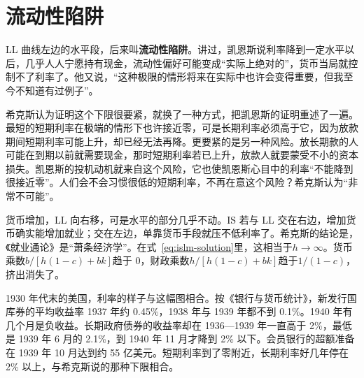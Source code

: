 \section{流动性陷阱}\label{sec:islm-trap}

LL 曲线左边的水平段，后来叫\textbf{流动性陷阱}。讲过，凯恩斯说利率降到一定水平以后，几乎人人宁愿持有现金，流动性偏好可能变成“实际上绝对的”，货币当局就控制不了利率了\cite{keynes1936}。他又说，“这种极限的情形将来在实际中也许会变得重要，但我至今不知道有过例子”\cite{keynes1936}。

希克斯认为证明这个下限很要紧，就换了一种方式，把凯恩斯的证明重述了一遍\cite{hicks1937}。最短的短期利率在极端的情形下也许接近零，可是长期利率必须高于它，因为放款期间短期利率可能上升，却已经无法再降\cite{hicks1937}。更要紧的是另一种风险。放长期款的人可能在到期以前就需要现金，那时短期利率若已上升，放款人就要蒙受不小的资本损失\cite{hicks1937}。凯恩斯的投机动机就来自这个风险，它也使凯恩斯心目中的利率“不能降到很接近零”\cite{hicks1937}。人们会不会习惯很低的短期利率，不再在意这个风险？希克斯认为“非常不可能”\cite{hicks1937}。

货币增加，LL 向右移，可是水平的部分几乎不动\cite{hicks1937}。IS 若与 LL 交在右边，增加货币确实能增加就业；交在左边，单靠货币手段就压不低利率了\cite{hicks1937}。希克斯的结论是，《就业通论》是“萧条经济学”\cite{hicks1937}。在式~\eqref{eq:islm-solution}里，这相当于$h\to\infty$。货币乘数$b/[h(1-c)+bk]$趋于 0，财政乘数$h/[h(1-c)+bk]$趋于$1/(1-c)$，挤出消失了。


1930 年代末的美国，利率的样子与这幅图相合。按《银行与货币统计》，新发行国库券的平均收益率 1937 年约 0.45\%，1938 年与 1939 年都不到 0.1\%\cite{bms1943b}。1940 年有几个月是负收益\cite{bms1943b}。长期政府债券的收益率却在 1936—1939 年一直高于 2\%，最低是 1939 年 6 月的 2.1\%，到 1940 年 11 月才降到 2\% 以下\cite{bms1943b}。会员银行的超额准备在 1939 年 10 月达到约 55 亿美元\cite{bms1943b}。短期利率到了零附近，长期利率好几年停在 2\% 以上，与希克斯说的那种下限相合。

